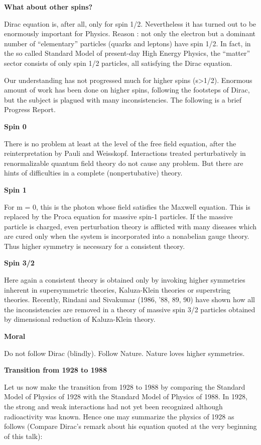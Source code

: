 \textbf{What about other spins?}

Dirac equation is, after all, only for spin 1/2. Nevertheless it has turned out to be enormously important for Physics. Reason : not only the electron but a dominant number of “elementary” particles (quarks and leptons) have spin 1/2. In fact, in the so called Standard Model of present-day High Energy Physics, the “matter” sector consists of only spin 1/2 particles, all satisfying the Dirac equation.

Our understanding has not progressed much for higher spins (s>1/2). Enormous amount of work has been done on higher spins, following the footsteps of Dirac, but the subject is plagued with many inconsistencies. The following is a brief Progress Report.
	
\textbf{Spin 0}

There is no problem at least at the level of the free field equation, after the reinterpretation by Pauli and Weisskopf. Interactions treated perturbatively in renormalizable quantum field theory do not cause any problem. But there are hints of difficulties in a complete (nonpertubative) theory.

\textbf{Spin 1}

For m = 0, this is the photon whose field satisfies the Maxwell equation. This is replaced by the Proca equation for massive spin-1 particles. If the massive particle is charged, even perturbation theory is afflicted with many diseases which are cured only when the system is incorporated into a nonabelian gauge theory. Thus higher symmetry is necessary for a consistent theory.

\textbf{Spin 3/2}

Here again a consistent theory is obtained only by invoking higher symmetries inherent in supersymmetric theories, Kaluza-Klein theories or superstring theories. Recently, Rindani and Sivakumar (1986, ’88, 89, 90) have shown how all the inconsistencies are removed in a theory of massive spin 3/2 particles obtained by dimensional reduction of Kaluza-Klein theory.

\textbf{Moral}

Do not follow Dirac (blindly). Follow Nature. Nature loves higher symmetries.

\textbf{Transition from 1928 to 1988}

Let us now make the transition from 1928 to 1988 by comparing the Standard Model of Physics of 1928 with the Standard Model of Physics of 1988. In 1928, the strong and weak interactions had not yet been recognized although radioactivity was known. Hence one may summarize the physics of 1928 as follows (Compare Dirac’s remark about his equation quoted at the very beginning of this talk):

